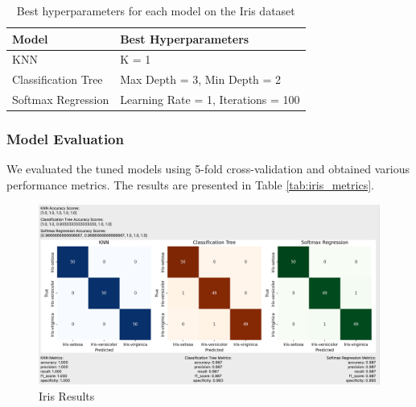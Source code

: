 \documentclass[letterpaper,10pt]{article}
\begin{document}
\begin{table}[ht]
\centering
\caption{Best hyperparameters for each model on the Iris dataset}
\label{tab:iris_tuning}
\begin{tabular}{|l|l|}
\hline
\textbf{Model} & \textbf{Best Hyperparameters} \\ %
\hline
KNN & K = 1 \\ %
\hline
Classification Tree & Max Depth = 3, Min Depth = 2 \\ %
\hline
Softmax Regression & Learning Rate = 1, Iterations = 100 \\ %
\hline
\end{tabular}
\end{table}

\subsubsection{Model Evaluation}

We evaluated the tuned models using 5-fold cross-validation and obtained various performance metrics. The results are presented in Table \ref{tab:iris_metrics}.

\begin{figure}[ht]
    \centering
    \includegraphics[width=1.0\textwidth]{iris_results.png}
    \caption{Iris Results}
    \label{iris_results}
\end{figure}
\end{document}

